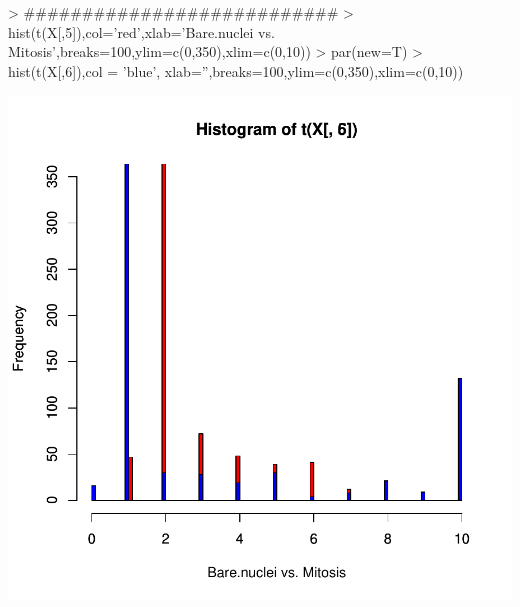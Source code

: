 \documentclass{article}
\begin{document}
\begin{Schunk}
\begin{Sinput}
> ###########################
> hist(t(X[,5]),col='red',xlab='Bare.nuclei vs. Mitosis',breaks=100,ylim=c(0,350),xlim=c(0,10))
> par(new=T)
> hist(t(X[,6]),col = 'blue', xlab='',breaks=100,ylim=c(0,350),xlim=c(0,10))
\end{Sinput}
\end{Schunk}
\includegraphics{selecao-015}
\end{document}
